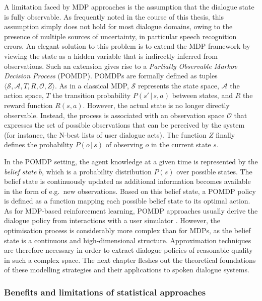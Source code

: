 A limitation faced by MDP approaches is the assumption that the dialogue state is fully observable. As frequently noted in the course of this thesis, this assumption simply does not hold for most dialogue domains, owing to the presence of multiple sources of uncertainty, in particular speech recognition errors.  An elegant solution to this problem is to extend the MDP framework by viewing the state as a hidden variable that is indirectly inferred from observations.  Such an extension gives rise to a  \textit{Partially Observable Markov Decision Process} (POMDP).  POMDPs are formally defined as tuples $\langle \mathcal{S}, \mathcal{A}, T, R, \mathcal{O}, Z \rangle$.  As in a classical MDP, $\mathcal{S}$ represents the state space, $\mathcal{A}$ the action space, $T$ the transition probability $P(s'\, | \, s,a)$ between states, and $R$ the reward function $R(s,a)$.  However, the actual state is no longer directly observable.  Instead, the process is associated with an observation space $\mathcal{O}$ that expresses the set of possible observations that can be perceived by the system (for instance, the N-best lists of user dialogue acts). The function $Z$ finally defines the probability $P(o\, | \, s)$ of observing $o$ in the current state $s$.  

In the POMDP setting, the agent knowledge at a given time is represented by the \textit{belief state} $b$, which is a probability distribution $P(s)$ over possible states.  The belief state is continuously updated as additional information becomes available in the form of e.g.\ new observations. Based on this belief state, a POMDP policy is defined as a function mapping each possible belief state to its optimal action.  As for MDP-based reinforcement learning, POMDP approaches usually derive the dialogue policy from interactions with a user simulator  \citep{Young:2010,Thomson:2010:BUD:1772996.1773040, daubigney2012}. However, the optimisation process is considerably more complex than for MDPs, as the belief state is a continuous and high-dimensional structure. Approximation techniques are therefore necessary in order to extract dialogue policies of reasonable quality in such a complex space. The next chapter fleshes out the theoretical foundations of these modelling strategies and their applications to spoken dialogue systems.

\subsubsection*{Benefits and limitations of statistical approaches}

